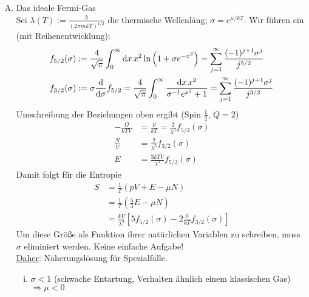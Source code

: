 \begin{enumerate}[A)]
    \item Das ideale Fermi-Gas \\
    Sei $\lambda(T) := \frac{h}{ \left( 2 \pi m k T \right)^{1/2} }$ die thermische Wellenläng; $\sigma = e^{\mu / kT}$. Wir führen ein (mit Reihenentwicklung):
    \begin{equation}
        \begin{split}
            f_{5/2}(\sigma) &:= \frac{4}{\sqrt{\pi}} \int_0^\infty \mathrm{d} x \, x^2 \ln \left( 1 + \sigma e^{-x^2} \right) = \sum_{j=1}^\infty \frac{(-1)^{j+1} \sigma^j}{j^{5/2}} \\
            f_{3/2}(\sigma) &:= \sigma \frac{\mathrm{d}}{\mathrm{d} \sigma} f_{5/2} = \frac{4}{\sqrt{\pi}} \int_0^\infty \frac{\mathrm{d} x \, x^2}{\sigma^{-1} e^{x^2} + 1} = \sum_{j=1}^{\infty} \frac{(-1)^{j+1} \sigma^j}{j^{3/2}}
        \end{split}
    \end{equation}
    Umschreibung der Beziehungen oben ergibt (Spin $\frac{1}{2}$, $Q = 2$)
    \begin{equation}
        \begin{split}
            - \frac{\Omega}{k T V} &= \frac{p}{k T} = \frac{2}{\lambda^3} f_{5/2} (\sigma) \\
            \frac{N}{V} &= \frac{2}{\lambda^3} f_{3/2} (\sigma) \\
            E &= \frac{3 k T V}{\lambda^3} f_{5/2} (\sigma)
        \end{split}
    \end{equation}
    Damit folgt für die Entropie
    \begin{equation}
        \begin{split}
            S &= \frac{1}{T} (p V + E - \mu N) \\
            &= \frac{1}{T} \left( \frac{5}{3}E - \mu N \right) \\
            &= \frac{k V}{\lambda^3} \left[ 5 f_{5/2}(\sigma) - 2 \frac{\mu}{k T} f_{3/2} (\sigma) \right] 
        \end{split}
    \end{equation}
    Um diese Größe als Funktion ihrer natürlichen Variablen zu schreiben, muss $\sigma$ eliminiert werden. Keine einfache Aufgabe! \\
    \underline{Daher}: Näherungslösung für Spezialfälle.
    \begin{enumerate}[i)]
        \item $\sigma < 1$ (schwache Entartung, Verhalten ähnlich einem klassischen Gas) $\Rightarrow \mu < 0$

\end{enumerate}
\end{enumerate}
